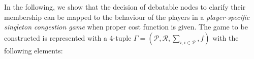 \documentclass[times]{ettauth}
\theoremstyle{mytheoremstyle}
\theoremstyle{mytheoremstyle}
\theoremstyle{mytheoremstyle}
\begin{document}


In the following, we show that the decision of debatable nodes to clarify their membership can be mapped to the behaviour of the players in a \textit{player-specific singleton congestion game} when proper cost function is given.
The game to be constructed is represented with a 4-tuple $\Gamma=(\mathcal{P},\mathcal{R},\sum_{i, i \in \mathcal{P}}, f)$ with the following elements:

\end{document}
